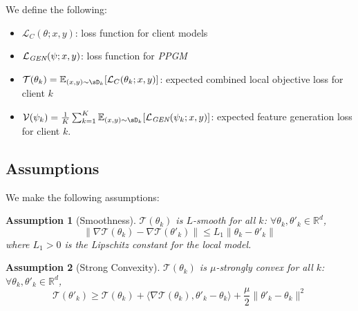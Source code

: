 \documentclass[lettersize,journal]{IEEEtran}
\newtheorem{assumption}{Assumption}
\begin{document}
We define the following:
\begin{itemize}
    \item $\mathcal{L}_C(\theta; x, y)$: loss function for client models
    \item $\mathcal{L}_{\emph{GEN}}(\psi; x, y)$: loss function for \emph{PPGM}
    \item $\mathcal{T}(\theta_k) = \mathbb{E}_{(x,y)\sim\sD_k}[\mathcal{L}_C(\theta_k; x, y)]$: expected combined local objective loss for client $k$
    \item $\mathcal{V}(\psi_k) = \frac{1}{K}\sum_{k=1}^K \mathbb{E}_{(x,y)\sim\sD_k}[\mathcal{L}_{\emph{GEN}}(\psi_k; x, y)]$: expected feature generation loss for client $k$.
\end{itemize}

\subsection{Assumptions}

We make the following assumptions:

\begin{assumption}[Smoothness]
\label{asm:1}
$\mathcal{T}(\theta_k)$ is $L$-smooth for all $k$: $\forall \theta_k, \theta'_k \in \mathbb{R}^d$,
\begin{equation}
    \|\nabla \mathcal{T}(\theta_k) - \nabla \mathcal{T}(\theta'_k)\| \leq L_1\|\theta_k - \theta'_k\|
\end{equation}
where $L_1 > 0$ is the Lipschitz constant for the local model.
\end{assumption}


\begin{assumption}[Strong Convexity]
\label{asm:2}
$\mathcal{T}(\theta_k)$ is $\mu$-strongly convex for all $k$: $\forall \theta_k, \theta'_k \in \mathbb{R}^d$,
\begin{equation}
    \mathcal{T}(\theta'_k) \geq \mathcal{T}(\theta_k) + \langle\nabla \mathcal{T}(\theta_k), \theta'_k - \theta_k\rangle + \frac{\mu}{2}\|\theta'_k - \theta_k\|^2
\end{equation}
\end{assumption}
\end{document}
